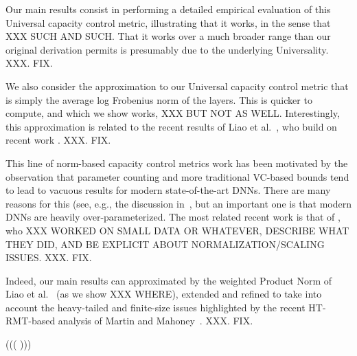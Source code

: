 Our main results consist in performing a detailed empirical evaluation of this Universal capacity control metric, illustrating that it works, in the sense that XXX SUCH AND SUCH.
That it works over a much broader range than our original derivation permits is presumably due to the underlying Universality.
XXX.  FIX.

We also consider the approximation to our Universal capacity control metric that is simply the average log Frobenius norm of the layers.
This is quicker to compute, and which we show works, XXX BUT NOT AS WELL.
Interestingly, this approximation is related to the recent results of Liao et al.~\cite{LMBx18_TR}, who build on recent work \cite{SHNx17_TR,PLMx18_TR}.
XXX.  FIX.


This line of norm-based capacity control metrics work has been motivated by the observation that parameter counting and more traditional VC-based bounds tend to lead to vacuous results for modern state-of-the-art DNNs.
There are many reasons for this (see, e.g., the discussion in~\cite{MM17_TR,MM18_TR}, but an important one is that modern DNNs are heavily over-parameterized.
The most related recent work is that of \cite{LMBx18_TR}, who XXX WORKED ON SMALL DATA OR WHATEVER, DESCRIBE WHAT THEY DID, AND BE EXPLICIT ABOUT NORMALIZATION/SCALING ISSUES.
XXX.  FIX.

Indeed, our main results can approximated by the weighted Product Norm of Liao et al.~\cite{LMBx18_TR} (as we show XXX WHERE), extended and refined to take into account the heavy-tailed and finite-size issues highlighted by the recent HT-RMT-based analysis of Martin and Mahoney~\cite{MM18_TR}.
XXX.  FIX.

(((
)))
  


